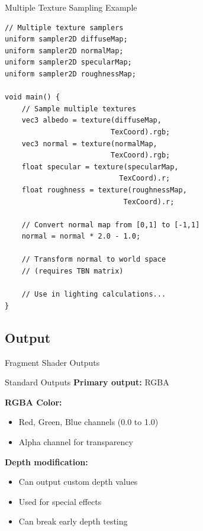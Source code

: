 \begin{frame}[fragile]{Multiple Texture Sampling Example}
      \begin{verbatim}
// Multiple texture samplers
uniform sampler2D diffuseMap;
uniform sampler2D normalMap;
uniform sampler2D specularMap;
uniform sampler2D roughnessMap;

void main() {
    // Sample multiple textures
    vec3 albedo = texture(diffuseMap,
                         TexCoord).rgb;
    vec3 normal = texture(normalMap,
                         TexCoord).rgb;
    float specular = texture(specularMap,
                           TexCoord).r;
    float roughness = texture(roughnessMap,
                            TexCoord).r;

    // Convert normal map from [0,1] to [-1,1]
    normal = normal * 2.0 - 1.0;

    // Transform normal to world space
    // (requires TBN matrix)

    // Use in lighting calculations...
}
      \end{verbatim}

\end{frame}

\subsection{Output}
\begin{frame}{Fragment Shader Outputs}
  \small
  \begin{raybox}{Standard Outputs}
    \textbf{Primary output:} RGBA

    \vspace{0.3cm}
    \textbf{RGBA Color:}
    \begin{itemize}
      \item Red, Green, Blue channels (0.0 to 1.0)
      \item Alpha channel for transparency
    \end{itemize}

    \vspace{0.3cm}
    \textbf{Depth modification:}
    \begin{itemize}
      \item Can output custom depth values
      \item Used for special effects
      \item Can break early depth testing
    \end{itemize}
  \end{raybox}
\end{frame}

